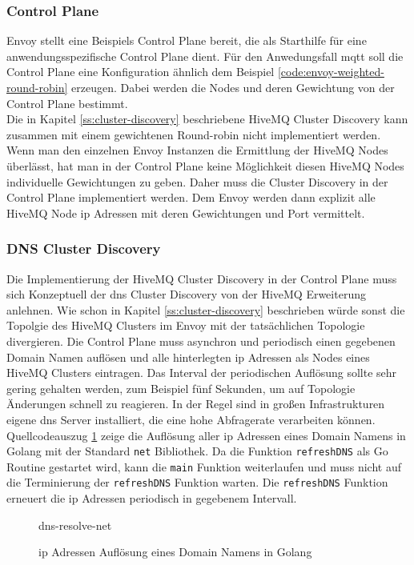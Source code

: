 \subsubsection{Control Plane}
Envoy stellt eine Beispiels Control Plane \cite{DynamicConfigurationControl} bereit, die als Starthilfe für eine anwendungsspezifische Control Plane dient. Für den Anwedungsfall \ac{mqtt} soll die Control Plane eine Konfiguration ähnlich dem Beispiel \ref{code:envoy-weighted-round-robin} erzeugen. Dabei werden die Nodes und deren Gewichtung von der Control Plane bestimmt.
\\
Die in Kapitel \ref{ss:cluster-discovery} beschriebene HiveMQ Cluster Discovery kann zusammen mit einem gewichtenen Round-robin nicht implementiert werden. Wenn man den einzelnen Envoy Instanzen die Ermittlung der HiveMQ Nodes überlässt, hat man in der Control Plane keine Möglichkeit diesen HiveMQ Nodes individuelle Gewichtungen zu geben. Daher muss die Cluster Discovery in der Control Plane implementiert werden. Dem Envoy werden dann explizit alle HiveMQ Node \ac{ip} Adressen mit deren Gewichtungen und Port vermittelt.

\subsubsection{DNS Cluster Discovery}
Die Implementierung der HiveMQ Cluster Discovery in der Control Plane muss sich Konzeptuell der \ac{dns} Cluster Discovery von der HiveMQ Erweiterung anlehnen. Wie schon in Kapitel \ref{ss:cluster-discovery} beschrieben würde sonst die Topolgie des HiveMQ Clusters im Envoy mit der tatsächlichen Topologie divergieren.
Die Control Plane muss asynchron und periodisch einen gegebenen Domain Namen auflösen und alle hinterlegten \ac{ip} Adressen als Nodes eines HiveMQ Clusters eintragen. Das Interval der periodischen Auflösung sollte sehr gering gehalten werden, zum Beispiel fünf Sekunden, um auf Topologie Änderungen schnell zu reagieren. In der Regel sind in gro{\ss}en Infrastrukturen eigene \ac{dns} Server installiert, die eine hohe Abfragerate verarbeiten können.
Quellcodeauszug \ref{code:dns-resolve-net} zeige die Auflösung aller \ac{ip} Adressen eines Domain Namens in Golang mit der Standard \verb|net| Bibliothek. Da die Funktion \verb|refreshDNS| als Go Routine gestartet wird, kann die \verb|main| Funktion weiterlaufen und muss nicht auf die Terminierung der \verb|refreshDNS| Funktion warten. Die \verb|refreshDNS| Funktion erneuert die \ac{ip} Adressen periodisch in gegebenem Intervall.
\begin{figure}
    {dns-resolve-net}
    \caption{\ac{ip} Adressen Auflösung eines Domain Namens in Golang}
    \label{code:dns-resolve-net}
\end{figure}

